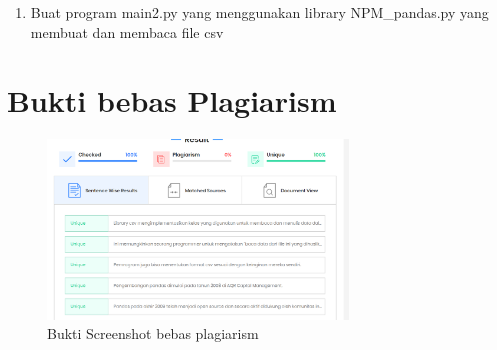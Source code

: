 \documentclass[a4paper, 12pt]{article}
\begin{document}
\begin{enumerate}
\begin{enumerate}
\item Buat program main2.py yang menggunakan library NPM\_pandas.py yang membuat dan membaca file csv

\end{enumerate}
\section{Bukti bebas Plagiarism}
\begin{figure}[H]
			\includegraphics[width=8cm]{figure/2.PNG}
			\centering
			\caption{Bukti Screenshot bebas plagiarism}
	\end{figure}
\end{enumerate}
\end{document}
